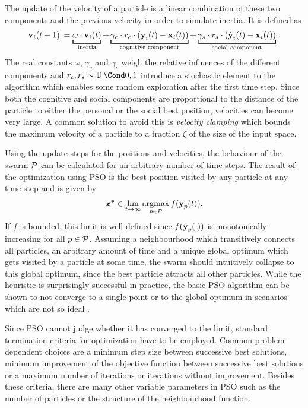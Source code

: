 The update of the velocity of a particle is a linear combination of these two components and the previous velocity in order to simulate inertia.
It is defined as
\begin{align}
    \label{eq:pso_velocity}
    \Vel_i(t+1) \coloneqq
        \underbracket[1pt]{\vphantom{\Cog_i}\omega \cdot \Vel_i(t)}_{\text{inertia}}
        + \underbracket[1pt]{\gamma_c \cdot r_c \cdot \left( \Cog_i(t) - \Pos_i(t) \right)}_{\text{cognitive component}}
        + \underbracket[1pt]{\gamma_s \cdot r_s \cdot \left( \Soc_i(t) - \Pos_i(t) \right)}_{\text{social component}}.
\end{align}
The real constants $\omega$, $\gamma_c$ and $\gamma_s$ weigh the relative influences of the different components and $r_c, r_s \sim \Uniform{0, 1}$ introduce a stochastic element to the algorithm which enables some random exploration after the first time step.
Since both the cognitive and social components are proportional to the distance of the particle to either the personal or the social best position, velocities can become very large.
A common solution to avoid this is \emph{velocity clamping} which bounds the maximum velocity of a particle to a fraction $\zeta$ of the size of the input space.

Using the update steps for the positions and velocities, the behaviour of the swarm $\operatorname{\mathcal{P}}$ can be calculated for an arbitrary number of time steps.
The result of the optimization using PSO is the best position visited by any particle at any time step and is given by
\begin{align}
    \bm{x^\ast} \in \lim_{t \to \infty} \operatorname*{argmax}_{p \in \operatorname{\mathcal{P}}} f(\operatorname{\mathbf{y}}_p(t)).
\end{align}
If $f$ is bounded, this limit is well-defined since $f(\operatorname{\mathbf{y}}_p(\cdot))$ is monotonically increasing for all $p \in \operatorname{\mathcal{P}}$.
Assuming a neighbourhood which transitively connects all particles, an arbitrary amount of time and a unique global optimum which gets visited by a particle at some time, the swarm should intuitively collapse to this global optimum, since the best particle attracts all other particles.
While the heuristic is surprisingly successful in practice, the basic PSO algorithm can be shown to not converge to a single point or to the global optimum in scenarios which are not so ideal \cite{engelbrecht_fundamentals_2006}.

Since PSO cannot judge whether it has converged to the limit, standard termination criteria for optimization have to be employed.
Common problem-dependent choices are a minimum step size between successive best solutions, minimum improvement of the objective function between successive best solutions or a maximum number of iterations or iterations without improvement.
Besides these criteria, there are many other variable parameters in PSO such as the number of particles or the structure of the neighbourhood function.

